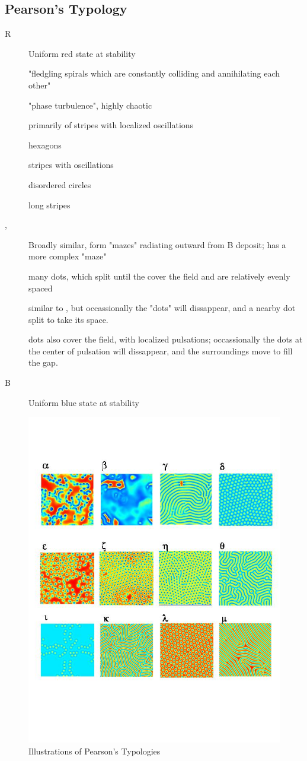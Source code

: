 \documentclass[titlepage]{scrartcl}
\begin{document}
\subsection{Pearson's Typology}
\begin{description}
    \item[R] Uniform red state at stability
    \item[\textalpha] "fledgling spirals which are constantly colliding and annihilating each other"
    \item[\textbeta] "phase turbulence", highly chaotic
    \item[\textgamma] primarily of stripes with localized oscillations
    \item[\textsigma] hexagons
    \item[\texteta] stripes with oscillations
    \item[\textiota]  disordered circles
    \item[\textmu] long stripes
    \item[\texttheta, \textkappa] Broadly similar, form "mazes" radiating outward from B deposit; \texttheta has a more complex "maze"
    \item[\textlambda] many dots, which split until the cover the field and are relatively evenly spaced
    \item[\textepsilon] similar to \texttheta, but occassionally the "dots" will dissappear, and a nearby dot split to take its space.
    \item[\textzeta] dots also cover the field, with localized pulsations; occassionally the dots at the center of pulsation will dissappear, and the surroundings move to fill the gap.
    \item[B] Uniform blue state at stability
\end{description}
\begin{figure}[h]
    \centering
    \includegraphics[scale=0.5]{fig2.jpg}
    \caption[Pearson's Typology Key]{Illustrations of Pearson's Typologies}
\end{figure}
\printbibliography
\end{document}
